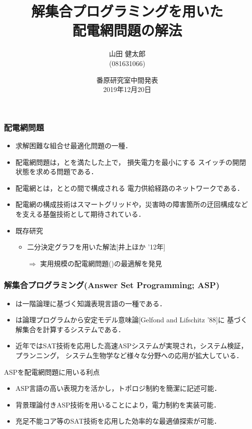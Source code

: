 \documentclass[dvipdfmx,11pt]{beamer}
\title{解集合プログラミングを用いた\\配電網問題の解法}
\author{山田 健太郎\\(081631066)}
\date{番原研究室中間発表\\2019年12月20日}
\institute{名古屋大学 工学部\\電気電子情報工学科}
\begin{document}
\begin{frame}\frametitle{}
  \titlepage
\end{frame}

\begin{frame}\frametitle{配電網問題}
 \begin{itemize}
  \item  求解困難な組合せ最適化問題の一種．
  \item  \alert{配電網問題}は，とを満たした上で，
		 損失電力を最小にする
		 スイッチの開閉状態を求める問題である．
  \item  \alert{配電網}とは，ととの間で構成される
		 電力供給経路のネットワークである．
  \item  配電網の構成技術はスマートグリッドや，災害時の障害箇所の迂回構成などを支える基盤技術として期待されている．
  \item  既存研究
		 \begin{itemize}
		  \item 二分決定グラフを用いた解法[井上ほか '12年]
		  \item[$\Rightarrow$] 実用規模の配電網問題()の最適解を発見
		 \end{itemize}
 \end{itemize}

\end{frame}

\begin{frame}\frametitle{解集合プログラミング(Answer Set Programming; ASP)}
 \begin{itemize}
  \item {}は一階論理に基づく知識表現言語の一種である．
  \item {}は論理プログラムから安定モデル意味論[Gelfond and Lifschitz '88]に
		基づく解集合を計算するシステムである．
  \item 近年ではSAT技術を応用した高速ASPシステムが実現され，システム検証，プランニング，
		システム生物学など様々な分野への応用が拡大している．
 \end{itemize}
 \begin{alertblock}{ASPを配電網問題に用いる利点}
   \begin{itemize}
	\item ASP言語の高い表現力を活かし，トポロジ制約を簡潔に記述可能．
	\item 背景理論付きASP技術を用いることにより，電力制約を実装可能．
	\item 充足不能コア等のSAT技術を応用した効率的な最適値探索が可能．
   \end{itemize}
 \end{alertblock}

\end{frame}
\end{document}
